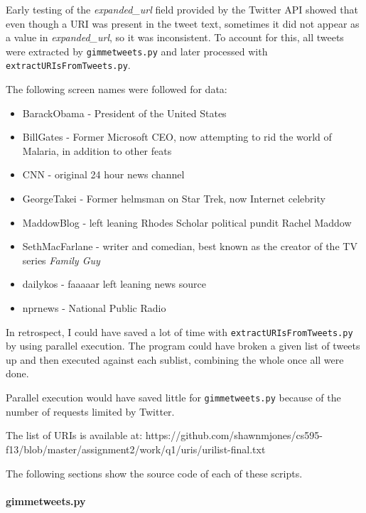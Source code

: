 \documentclass[letterpaper,11pt]{article}
\begin{document}
Early testing of the \emph{expanded\_url} field provided by the Twitter API showed that even though a URI was present in the tweet text, sometimes it did not appear as a value in \emph{expanded\_url}, so it was inconsistent.  To account for this, all tweets were extracted by \verb+gimmetweets.py+ and later processed with \verb+extractURIsFromTweets.py+.

The following screen names were followed for data:
\begin{itemize}
\item BarackObama -  President of the United States
\item BillGates - Former Microsoft CEO, now attempting to rid the world of Malaria, in addition to other feats
\item CNN - original 24 hour news channel
\item GeorgeTakei - Former helmsman on Star Trek, now Internet celebrity
\item MaddowBlog - left leaning Rhodes Scholar political pundit Rachel Maddow
\item SethMacFarlane - writer and comedian, best known as the creator of the TV series \emph{Family Guy}
\item dailykos - faaaaar left leaning news source
\item nprnews - National Public Radio
\end{itemize}

In retrospect, I could have saved a lot of time with \verb+extractURIsFromTweets.py+ by using parallel execution.  The program could have broken a given list of tweets up and then executed against each sublist, combining the whole once all were done.

Parallel execution would have saved little for \verb+gimmetweets.py+ because of the number of requests limited by Twitter.

The list of URIs is available at:
https://github.com/shawnmjones/cs595-f13/blob/master/assignment2/work/q1/uris/urilist-final.txt

The following sections show the source code of each of these scripts.

\newpage
\paragraph{gimmetweets.py}\mbox{} \\


\end{document}
